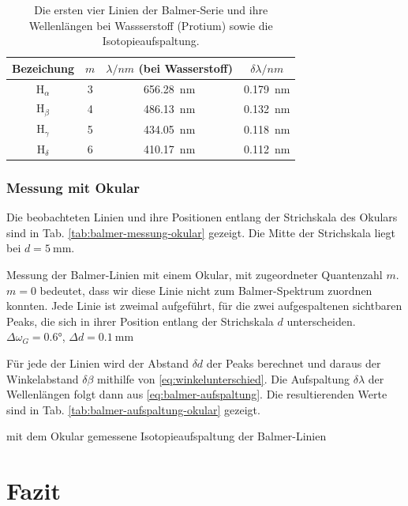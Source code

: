 \documentclass{article}
\begin{document}
\begin{table}
  \begin{tabular}{c||c|c|c}
    Bezeichung & $m$ & $\lambda/\si{nm}$ (bei Wasserstoff) & $\delta \lambda/\si{nm}$ \\ \hline
    H$_\alpha$ & 3 & \SI{656.28}{\nm} & \SI{0.179}{\nm} \\
    H$_\beta$  & 4 & \SI{486.13}{\nm} & \SI{0.132}{\nm} \\
    H$_\gamma$ & 5 & \SI{434.05}{\nm} & \SI{0.118}{\nm} \\
    H$_\delta$ & 6 & \SI{410.17}{\nm} & \SI{0.112}{\nm}
  \end{tabular}
  \caption{Die ersten vier Linien der Balmer-Serie und ihre Wellenlängen bei Wassserstoff (Protium) sowie die Isotopieaufspaltung. \cite{leybold-balmer}}
  \label{tab:balmer-literatur}
\end{table}

\subsubsection{Messung mit Okular}
Die beobachteten Linien und ihre Positionen entlang der Strichskala des Okulars sind in Tab. \ref{tab:balmer-messung-okular}
gezeigt. Die Mitte der Strichskala liegt bei $d = \SI{5}{\mm}$.
\begin{table}[h]
  \centering
  \caption{Messung der Balmer-Linien mit einem Okular, mit zugeordneter Quantenzahl $m$.
  $m=0$ bedeutet, dass wir diese Linie nicht zum Balmer-Spektrum zuordnen konnten.
  Jede Linie ist zweimal aufgeführt, für die zwei aufgespaltenen sichtbaren Peaks, die sich in ihrer Position entlang der Strichskala $d$ unterscheiden.
  $\Delta \omega_G=\ang{0.6}$, $\Delta d=\SI{0.1}{\mm}$}
  \label{tab:balmer-linien-okular}
\end{table}

Für jede der Linien wird der Abstand $\delta d$ der Peaks berechnet und daraus
der Winkelabstand $\delta \beta$ mithilfe von \eqref{eq:winkelunterschied}.
Die Aufspaltung $\delta \lambda$ der Wellenlängen folgt dann aus \eqref{eq:balmer-aufspaltung}.
Die resultierenden Werte sind in Tab. \ref{tab:balmer-aufspaltung-okular} gezeigt.
\begin{table}
  \caption{mit dem Okular gemessene Isotopieaufspaltung der Balmer-Linien}
  \label{tab:balmer-aufspaltung-okular}
\end{table}



\clearpage
\section{Fazit}
\end{document}
